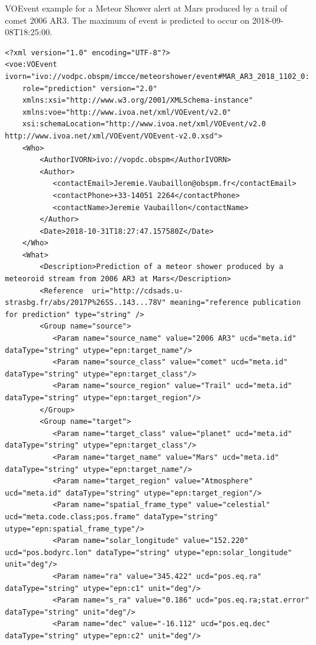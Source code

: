 \documentclass[referee,a4paper,12pt,traditabstract]{swsc}
\begin{document}
\begin{linenumbers}
VOEvent example for a Meteor Shower alert at Mars produced by a trail of comet 2006 AR3. The maximum of event is predicted to occur on 2018-09-08T18:25:00.

{\tiny 
\begin{verbatim}
<?xml version="1.0" encoding="UTF-8"?>
<voe:VOEvent ivorn="ivo://vodpc.obspm/imcce/meteorshower/event#MAR_AR3_2018_1102_0::v1.0"
    role="prediction" version="2.0"
    xmlns:xsi="http://www.w3.org/2001/XMLSchema-instance"
    xmlns:voe="http://www.ivoa.net/xml/VOEvent/v2.0"
    xsi:schemaLocation="http://www.ivoa.net/xml/VOEvent/v2.0 http://www.ivoa.net/xml/VOEvent/VOEvent-v2.0.xsd">
    <Who>
        <AuthorIVORN>ivo://vopdc.obspm</AuthorIVORN>
        <Author>
           <contactEmail>Jeremie.Vaubaillon@obspm.fr</contactEmail>
           <contactPhone>+33-14051 2264</contactPhone>
           <contactName>Jeremie Vaubaillon</contactName> 
        </Author>
        <Date>2018-10-31T18:27:47.157580Z</Date>
    </Who>
    <What>
        <Description>Prediction of a meteor shower produced by a meteoroid stream from 2006 AR3 at Mars</Description>
        <Reference  uri="http://cdsads.u-strasbg.fr/abs/2017P%26SS..143...78V" meaning="reference publication for prediction" type="string" />
        <Group name="source">
           <Param name="source_name" value="2006 AR3" ucd="meta.id" dataType="string" utype="epn:target_name"/>
           <Param name="source_class" value="comet" ucd="meta.id" dataType="string" utype="epn:target_class"/>
           <Param name="source_region" value="Trail" ucd="meta.id" dataType="string" utype="epn:target_region"/>
        </Group>
        <Group name="target">
           <Param name="target_class" value="planet" ucd="meta.id" dataType="string" utype="epn:target_class"/>
           <Param name="target_name" value="Mars" ucd="meta.id" dataType="string" utype="epn:target_name"/>
           <Param name="target_region" value="Atmosphere" ucd="meta.id" dataType="string" utype="epn:target_region"/>
           <Param name="spatial_frame_type" value="celestial" ucd="meta.code.class;pos.frame" dataType="string" utype="epn:spatial_frame_type"/>
           <Param name="solar_longitude" value="152.220" ucd="pos.bodyrc.lon" dataType="string" utype="epn:solar_longitude" unit="deg"/>
           <Param name="ra" value="345.422" ucd="pos.eq.ra" dataType="string" utype="epn:c1" unit="deg"/>
           <Param name="s_ra" value="0.186" ucd="pos.eq.ra;stat.error" dataType="string" unit="deg"/>
           <Param name="dec" value="-16.112" ucd="pos.eq.dec" dataType="string" utype="epn:c2" unit="deg"/>

\end{verbatim}}
\end{linenumbers}
\end{document}
